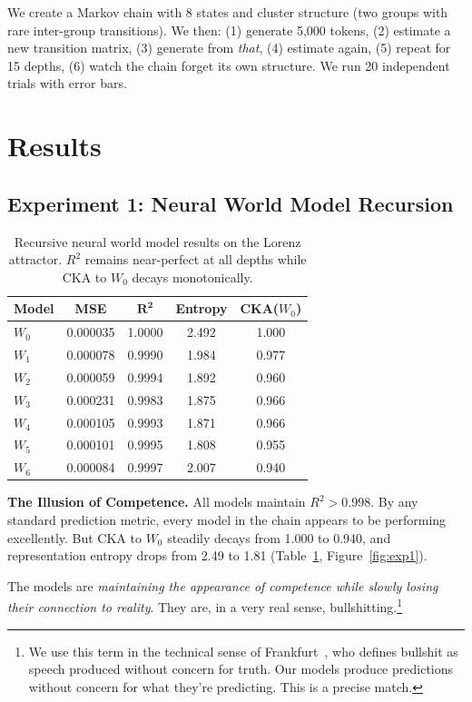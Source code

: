 \documentclass[11pt, twocolumn]{article}
\begin{document}
We create a Markov chain with 8 states and cluster structure (two groups with rare inter-group transitions). We then: (1) generate 5{,}000 tokens, (2) estimate a new transition matrix, (3) generate from \textit{that}, (4) estimate again, (5) repeat for 15 depths, (6) watch the chain forget its own structure. We run 20 independent trials with error bars.

\section{Results}
\label{sec:results}

\subsection{Experiment 1: Neural World Model Recursion}

\begin{table}[h]
\centering
\small
\caption{Recursive neural world model results on the Lorenz attractor. $R^2$ remains near-perfect at all depths while CKA to $W_0$ decays monotonically.}
\label{tab:exp1}
\begin{tabular}{@{}lcccc@{}}
\toprule
\textbf{Model} & \textbf{MSE} & $\mathbf{R^2}$ & \textbf{Entropy} & \textbf{CKA($W_0$)} \\
\midrule
$W_0$ & 0.000035 & 1.0000 & 2.492 & 1.000 \\
$W_1$ & 0.000078 & 0.9990 & 1.984 & 0.977 \\
$W_2$ & 0.000059 & 0.9994 & 1.892 & 0.960 \\
$W_3$ & 0.000231 & 0.9983 & 1.875 & 0.966 \\
$W_4$ & 0.000105 & 0.9993 & 1.871 & 0.966 \\
$W_5$ & 0.000101 & 0.9995 & 1.808 & 0.955 \\
$W_6$ & 0.000084 & 0.9997 & 2.007 & 0.940 \\
\bottomrule
\end{tabular}
\end{table}

\textbf{The Illusion of Competence.} All models maintain $R^2 > 0.998$. By any standard prediction metric, every model in the chain appears to be performing excellently. But CKA to $W_0$ steadily decays from 1.000 to 0.940, and representation entropy drops from 2.49 to 1.81 (Table~\ref{tab:exp1}, Figure~\ref{fig:exp1}).

The models are \textit{maintaining the appearance of competence while slowly losing their connection to reality}. They are, in a very real sense, bullshitting.\footnote{We use this term in the technical sense of Frankfurt~\cite{frankfurt2005}, who defines bullshit as speech produced without concern for truth. Our models produce predictions without concern for what they're predicting. This is a precise match.}
\end{document}
